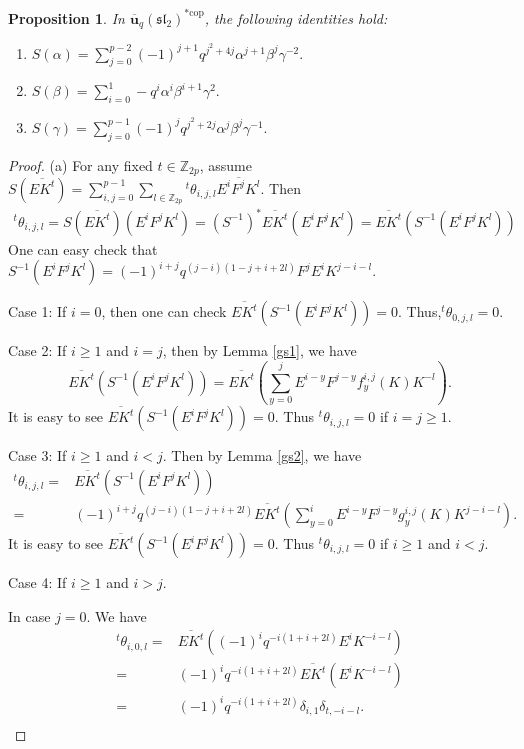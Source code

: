 \documentclass[10pt,oneside]{amsart}
\newcommand{\uq}{\mathbf{\overline{u}}_q(\mathfrak{sl_2})}
\newcommand{\cop}{\mathrm{cop}}
\newtheorem{proposition}{Proposition}[section]
\theoremstyle{definition}
\def\>{\geqslant}
\def\a{\alpha}
\def\b{\beta}
\def\g{\gamma}
\begin{document}
\begin{proposition}\label{2.10}\label{2.11}\label{2.12}
In $\uq^{*\cop}$, the following identities hold:
\begin{enumerate}
\item[(a)]
$S(\a)=\sum_{j=0}^{p-2}(-1)^{j+1}q^{j^2+4j}\a^{j+1}\b^j \g^{-2}.$
\item[(b)]
$S(\b)=\sum_{i=0}^{1}-q^{i}\a^{i}\b^{i+1} \g^{2}.$
\item[(c)]
$S(\g)=\sum_{j=0}^{p-1}(-1)^jq^{j^2+2j}\a^{j}\b^{j} \g^{-1}.$
\end{enumerate}
\end{proposition}
\begin{proof}
\textup{(a)}
For any fixed $t\in \mathbb{Z}_{2p}$, assume $S(\overline{EK^t})=\sum_{i,j=0}^{p-1}\sum_{l\in \mathbb{Z}_{2p}}{^t\theta_{i,j,l}}\overline{E^iF^jK^l}.$  Then $$\begin{array}{rl}
{^t\theta_{i,j,l}}=S(\overline{EK^t})(E^iF^jK^l)=(S^{-1})^*\overline{EK^t}(E^iF^jK^l)=
\overline{EK^t}(S^{-1}(E^iF^jK^l))\end{array}$$ One can easy check that
$S^{-1}(E^iF^jK^l)=(-1)^{i+j}q^{(j-i)(1-j+i+2l)}F^jE^iK^{j-i-l}.$

Case 1: If $i=0$, then one can check $\overline{EK^t}(S^{-1}(E^iF^jK^l))=0$. Thus,${^t\theta_{0,j,l}}=0$.

Case 2: If $i\>1$ and $i=j$, then by Lemma \ref{gs1}, we have $$\overline{EK^t}(S^{-1}(E^iF^jK^l))=\overline{EK^t}(\sum_{y=0}^jE^{i-y}F^{j-y}f^{i,j}_{y}(K)K^{-l}).$$ It is easy to see $\overline{EK^t}(S^{-1}(E^iF^jK^l))=0$. Thus ${^t\theta_{i,j,l}}=0$ if $i=j\>1$.

Case 3: If $i\>1$ and $i<j$. Then by Lemma \ref{gs2}, we have $$\begin{array}{rl}
{^t\theta_{i,j,l}}=&\overline{EK^t}(S^{-1}(E^iF^jK^l))\\
=&(-1)^{i+j}q^{(j-i)(1-j+i+2l)}\overline{EK^t}(\sum_{y=0}^i
E^{i-y}F^{j-y}g^{i,j}_{y}(K)K^{j-i-l}).\end{array}$$ It is easy to see $\overline{EK^t}(S^{-1}(E^iF^jK^l))=0$. Thus ${^t\theta_{i,j,l}}=0$ if $i\>1$ and $i<j$.

Case 4: If $i\>1$ and $i>j$.

 In case $j=0$. We have $$\begin{array}{rl}
{^t\theta_{i,0,l}}
=&\overline{EK^t}((-1)^iq^{-i(1+i+2l)}E^iK^{-i-l})\\
=&(-1)^iq^{-i(1+i+2l)}\overline{EK^t}(E^iK^{-i-l})\\
=&(-1)^iq^{-i(1+i+2l)}\delta_{i,1}\delta_{t,-i-l}.\\\end{array}$$


\end{proof}
\end{document}
